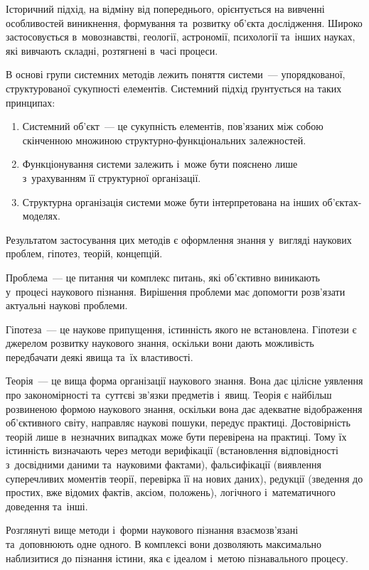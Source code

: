 \documentclass[a5paper,oneside,DIV=12,12pt,headings=small]{scrartcl}
\begin{document}
		Історичний підхід, на відміну від попереднього, орієнтується на вивченні особливостей виникнення, формування та~розвитку об'\-єкта дослідження. Широко застосовується в~мовознавстві, геології, астрономії, психології та~інших науках, які вивчають складні, розтягнені в~часі процеси.
		
		В основі групи системних методів лежить поняття системи~— упорядкованої, структурованої сукупності елементів. Системний підхід ґрунтується на таких принципах:
		\begin{enumerate}
			\item Системний об'\-єкт~— це сукупність елементів, пов'\-я\-за\-них між собою скінченною множиною струк\-тур\-но-функ\-ці\-о\-наль\-них залежностей.
			\item Функціонування системи залежить і~може бути пояснено лише з~урахуванням її структурної організації.
			\item Структурна організація системи може бути інтерпретована на інших об'\-єк\-тах-моделях.
		\end{enumerate}
		
		Результатом застосування цих методів є оформлення знання у~вигляді наукових проблем, гіпотез, теорій, концепцій.
		
		Проблема~— це питання чи комплекс питань, які об'\-єктивно виникають у~процесі наукового пізнання. Вирішення проблеми має допомогти розв'язати актуальні наукові проблеми.
		
		Гіпотеза~— це наукове припущення, істинність якого не встановлена. Гіпотези є джерелом розвитку наукового знання, оскільки вони дають можливість передбачати деякі явища та~їх властивості.
		
		Теорія~— це вища форма організації наукового знання. Вона дає цілісне уявлення про закономірності та~суттєві зв'язки предметів і~явищ. Теорія є найбільш розвиненою формою наукового знання, оскільки вона дає адекватне відображення об'\-єктивного світу, направляє наукові пошуки, передує практиці. Достовірність теорій лише в~незначних випадках може бути перевірена на практиці. Тому їх істинність визначають через методи верифікації (встановлення відповідності з~досвідними даними та~науковими фактами), фальсифікації (виявлення суперечливих моментів теорії, перевірка її на нових даних), редукції (зведення до простих, вже відомих фактів, аксіом, положень), логічного і~математичного доведення та~інші.
		
		Розглянуті вище методи і~форми наукового пізнання взаємозв'язані та~доповнюють одне одного. В комплексі вони дозволяють максимально наблизитися до пізнання істини, яка є ідеалом і~метою пізнавального процесу.
		 
\end{document}
